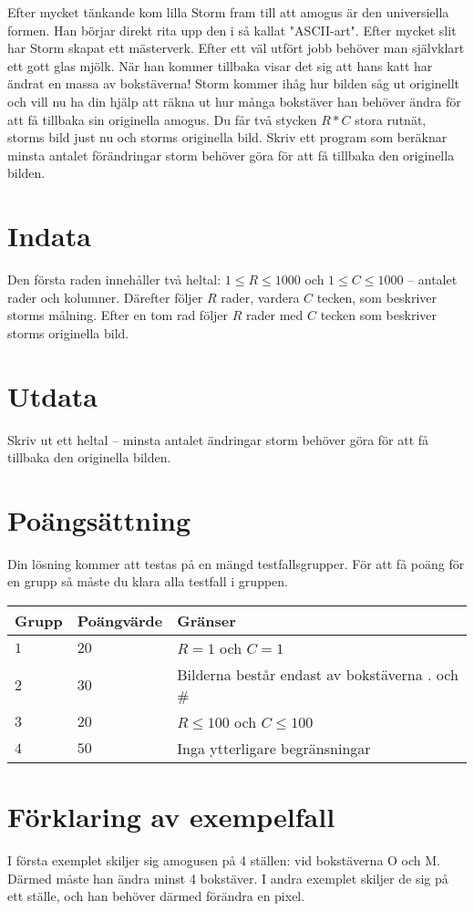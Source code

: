 Efter mycket tänkande kom lilla Storm fram till att amogus är den universiella formen. Han börjar direkt rita upp den
i så kallat "ASCII-art". Efter mycket slit har Storm skapat ett mästerverk. Efter ett väl utfört jobb behöver man
självklart ett gott glas mjölk. När han kommer tillbaka visar det sig att hans katt har ändrat en massa av bokstäverna!
Storm kommer ihåg hur bilden såg ut originellt och vill nu ha din hjälp att räkna ut hur många bokstäver han behöver ändra
för att få tillbaka sin originella amogus.
Du får två stycken $R*C$ stora rutnät, storms bild just nu och storms originella bild. Skriv ett program som beräknar
minsta antalet förändringar storm behöver göra för att få tillbaka den originella bilden.

\section*{Indata}
Den första raden innehåller två heltal: $1\leq R \leq 1000$ och $1 \leq C \leq 1000$ -- antalet rader och kolumner.
Därefter följer $R$ rader, vardera $C$ tecken, som beskriver storms målning. 
Efter en tom rad följer $R$ rader med $C$ tecken som beskriver storms originella bild. 

\section*{Utdata}
Skriv ut ett heltal -- minsta antalet ändringar storm behöver göra för att få tillbaka den originella bilden.

\section*{Poängsättning}
Din lösning kommer att testas på en mängd testfallsgrupper.
För att få poäng för en grupp så måste du klara alla testfall i gruppen.

\noindent
\begin{tabular}{| l | l | p{12cm} |}
  \hline
  Grupp & Poängvärde & Gränser \\ \hline
  $1$   & $20$       & $R=1$ och $C=1$ \\ \hline
  $2$   & $30$       & Bilderna består endast av bokstäverna . och \#\\ \hline
  $3$   & $20$       & $R \leq 100$ och $C \leq 100$  \\ \hline
  $4$   & $50$       & Inga ytterligare begränsningar  \\ \hline
\end{tabular}

\section*{Förklaring av exempelfall}
I första exemplet skiljer sig amogusen på 4 ställen: vid bokstäverna O och M. Därmed måste han ändra minst 4 bokstäver.
I andra exemplet skiljer de sig på ett ställe, och han behöver därmed förändra en pixel.